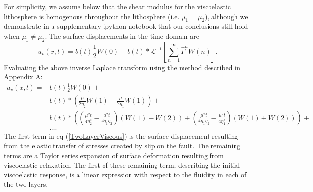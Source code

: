 \documentclass[fleqn,12pt]{article}
\begin{document}
For simplicity, we assume below that the shear modulus for the
viscoelastic lithosphere is homogenous throughout the lithosphere
(i.e. $\mu_1 = \mu_2$), although we demonstrate in a supplementary
ipython notebook that our conclusions still hold when $\mu_1 \neq
\mu_2$.  The surface displacements in the time domain are
\begin{equation}
 u_v(x,t) = b(t)\frac{1}{2}W(0) + 
            b(t)\ast\mathcal{L}^{-1}\left[\sum_{n=1}^\infty\hat{\Gamma}^{n}W(n)\right].
\end{equation}
Evaluating the above inverse Laplace transform using the method
described in Appendix A:
\begin{align}\label{TwoLayerViscous}
  u_v(x,t) = &b(t)\frac{1}{2}W(0) +\nonumber\\
             &b(t)\ast\left(\frac{\mu}{2\eta_2}W(1) - \frac{\mu}{2\eta_1}W(1)\right) +\nonumber\\
             &b(t)\ast\left(\left(\frac{\mu^2t}{4\eta_2^2} -
                  \frac{\mu^2t}{4\eta_1\eta_2}\right) \left(W(1) - W(2)\right) +
                  \left(\frac{\mu^2t}{4\eta_1\eta_2} - \frac{\mu^2t}{4\eta_1^2}\right)
                  \left(W(1) + W(2)\right)\right) + \nonumber\\ 
             &\dots.
\end{align} 
The first term in eq (\ref{TwoLayerViscous}) is the surface
displacement resulting from the elastic transfer of stresses created
by slip on the fault.  The remaining terms are a Taylor series
expansion of surface deformation resulting from viscoelastic
relaxation.  The first of these remaining term, describing the initial
viscoelastic response, is a linear expression with respect to the
fluidity in each of the two layers.  
\end{document}
